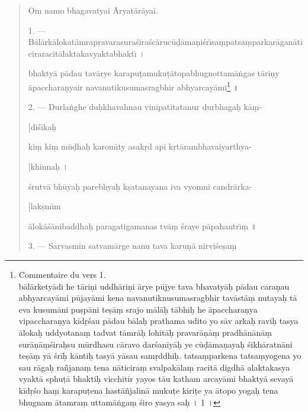 \documentclass[a4paper, 11pt, oneside, french, landscape, twocolumn]{article}
\begin{document}
\begin{quotation}\scriptsize
Om namo bhagavatyai \={A}ryat\={a}r\={a}yai.

\bigskip

1. --- B\={a}l\={a}rk\={a}lokat\={a}mrapravarasura\'{s}ira\'{s}c\={a}ruc\={u}\d{d}\={a}ma\d{n}i\'{s}r\={\i}sa\d{m}patsa\d{m}parkar\={a}gan\={a}ticiraracit\={a}laktakavyaktabhakt\={\i} \texthindi{।}

bhakty\={a} p\={a}dau tav\={a}rye karapu\d{t}amuku\d{t}\={a}topabhugnottam\={a}\.{n}gas t\={a}ri\d{n}y \={a}pacchara\d{n}yair navanutikusumasragbhir abhyarcay\={a}mi\footnote{Commentaire du vers 1.\\\hspace*{5mm}bālārketyādi he tāriṇi uddhāriṇi ārye pūjye tava bhavatyāḥ pādau caraṇau abhyarcayāmi pūjayāmi kena navanutiknusumasragbhir tavāstāṃ nutayaḥ tā eva kusumāni puṣpāni teṣāṃ srajo mālāḥ tābhiḥ he āpaccharaṇya vipaccharaṇya kīdṛśau pādau bālaḥ prathama udito yo sāv arkaḥ raviḥ tasya ālokaḥ uddyotanaṃ tadvat tāmrāḥ lohitāḥ pravarāṇāṃ pradhānānāṃ surāṇāṃśiraḥsu mūrdhasu cāravo darśanīyāḥ ye cūḍāmaṇayaḥ śikhāratnāni teṣāṃ yā śrīḥ kāntiḥ tasyā yāsau samṛddhiḥ. tatsaṃparkena tatsaṃyogena yo sau rāgaḥ rañjanaṃ tena nāticiraṃ svalpakālaṃ racitā digdhā alaktakasya vyaktā sphuṭā bhaktiḥ vicchitir yayos tāu katham arcayāmi bhaktyā sevayā kīdṛśo haṃ karapuṭena hastāñjalinā mukuṭe kiriṭe ya ātopo yogaḥ tena bhugnam ātamraṃ uttamāṅgaṃ śiro yasya saḥ \texthindi{।} 1 \texthindi{।}} \texthindi{॥}

\bigskip

2. --- Durla\.{n}ghe du\d{h}khavahnau vinipatitatanur durbhaga\d{h} k\={a}\d{m}-

\hspace*{55mm}[di\'{s}\={\i}ka\d{h}

ki\d{m} ki\d{m} m\={u}\d{d}ha\d{h} karom\={\i}ty asak\d{r}d api k\d{r}t\={a}rambhavaiyarthya-

\hspace*{55mm}[khinna\d{h} \texthindi{।}

\'{s}rutv\={a} bh\={u}ya\d{h} parebhya\d{h} k\d{s}atanayana iva vyomni candr\={a}rka-

\hspace*{55mm}[lak\d{s}m\={\i}m

\={a}lok\={a}\'{s}\={a}nibaddha\d{h} paragatigamanas tv\={a}\d{m} \'{s}raye p\={a}pahantr\={\i}\d{m} \texthindi{॥}

\bigskip

3. --- Sarvasmin satvam\={a}rge nanu tava karu\d{n}\={a} nirvi\'{s}e\d{s}a\d{m}


\end{quotation}
\end{document}
